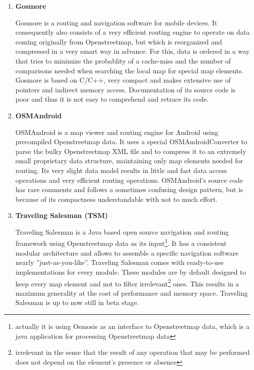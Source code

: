 \begin{enumerate}

	\item \textbf{Gosmore}
	
		Gosmore is a routing and navigation software for mobile devices. It consequently also consists of a very efficient routing engine to operate on data coming originally from Openstreetmap, but which is reorganized and compressed in a very smart way in advance. For this, data is ordered in a way that tries to minimize the probablity of a cache-miss and the number of comparisons needed when searching the local map for special map elements.
		Gosmore is based on C/C++, very compact and makes extensive use of pointers and indirect memory access. Documentation of its source code is poor and thus it is not easy to comprehend and retrace its code.
	
	\item \textbf{OSMAndroid}
	
		OSMAndroid is a map viewer and routing engine for Android using precompiled Openstreetmap data. It uses a special OSMAndroidConverter to parse the bulky Openstreetmap XML file and to compress it to an extremely small 	proprietary data structure, maintaining only map elements needed for routing. Its very slight data model results in little and fast data access operations and very efficient routing operations.
		OSMAndroid's source code has rare comments and follows a sometimes confusing design pattern, but is because of its compactness understandable with not to much effort.
	
	\item \textbf{Traveling Salesman (TSM)}
	
		Traveling Salesman is a Java based open source navigation and routing framework using Openstreetmap data as its input\footnote{actually it is using Osmosis as an interface to Openstreetmap data, which is a java application for processing Openstreetmap data}. It has a consistent modular architecture and allows to assemble a specific navigation software nearly ''just-as-you-like''. Traveling Salesman comes with ready-to-use implementations for every module. These modules are by default designed to keep every map element and not to filter irrelevant\footnote{irrelevant in the sense that the result of any operation that may be performed does not depend on the element's presence or absence} ones. This results in a maximum generality at the cost of performance and memory space.
		Traveling Salesman is up to now still in beta stage.

\end{enumerate}

